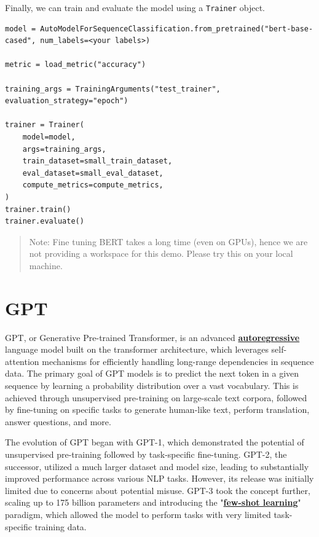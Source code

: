 Finally, we can train and evaluate the model using a \lstinline|Trainer| object.

\begin{lstlisting}
model = AutoModelForSequenceClassification.from_pretrained("bert-base-cased", num_labels=<your labels>)

metric = load_metric("accuracy")

training_args = TrainingArguments("test_trainer", evaluation_strategy="epoch")

trainer = Trainer(
    model=model,
    args=training_args,
    train_dataset=small_train_dataset,
    eval_dataset=small_eval_dataset,
    compute_metrics=compute_metrics,
)
trainer.train()
trainer.evaluate()
\end{lstlisting}

\begin{quote}
Note: Fine tuning BERT takes a long time (even on GPUs), hence we are not providing a workspace for this demo. Please try this on your local machine.
\end{quote}

\section{GPT}

GPT, or Generative Pre-trained Transformer, is an advanced \href{https://en.wikipedia.org/wiki/Autoregressive_model}{\textbf{autoregressive}} language model built on the transformer architecture, which leverages self-attention mechanisms for efficiently handling long-range dependencies in sequence data. The primary goal of GPT models is to predict the next token in a given sequence by learning a probability distribution over a vast vocabulary. This is achieved through unsupervised pre-training on large-scale text corpora, followed by fine-tuning on specific tasks to generate human-like text, perform translation, answer questions, and more. \newline

The evolution of GPT began with GPT-1, which demonstrated the potential of unsupervised pre-training followed by task-specific fine-tuning. GPT-2, the successor, utilized a much larger dataset and model size, leading to substantially improved performance across various NLP tasks. However, its release was initially limited due to concerns about potential misuse. GPT-3 took the concept further, scaling up to 175 billion parameters and introducing the "\href{https://paperswithcode.com/task/few-shot-learning}{\textbf{few-shot learning}}" paradigm, which allowed the model to perform tasks with very limited task-specific training data.\newline


